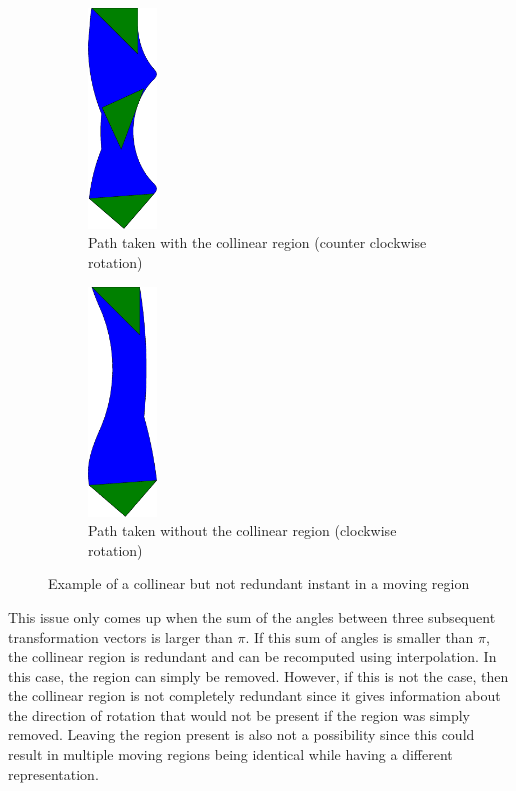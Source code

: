 \begin{figure}[h!]
    \centering
    \begin{subfigure}{.475\textwidth}
        \centering
        \includegraphics[width=0.2\textwidth]{images/collinear_not_redundant.pdf}
        \caption{Path taken with the collinear region (counter clockwise rotation)}
    \end{subfigure}
    \hfill
    \begin{subfigure}{.475\textwidth}
        \centering
        \includegraphics[width=0.2\textwidth]{images/collinear_not_redundant_2.pdf}
        \caption{Path taken without the collinear region (clockwise rotation)}
    \end{subfigure}
    \caption{Example of a collinear but not redundant instant in a moving region}
    \label{fig:collinear_not_redundant}
\end{figure}

This issue only comes up when the sum of the angles between three subsequent transformation vectors is larger than $\pi$. If this sum of angles is smaller than $\pi$, the collinear region is redundant and can be recomputed using interpolation. In this case, the region can simply be removed. However, if this is not the case, then the collinear region is not completely redundant since it gives information about the direction of rotation that would not be present if the region was simply removed. Leaving the region present is also not a possibility since this could result in multiple moving regions being identical while having a different representation.

